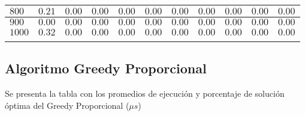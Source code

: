 \documentclass[12pt]{article}
\begin{document}
\begin{tabu}{|@{}*{11}{p{1.4cm}@{}|}}
$800$ & $0.21$ & $0.00$ & $0.00$ & $0.00$ & $0.00$ & $0.00$ & $0.00$ & $0.00$ & $0.00$ & $0.00$ \\\hline
$900$ & $0.00$ & $0.00$ & $0.00$ & $0.00$ & $0.00$ & $0.00$ & $0.00$ & $0.00$ & $0.00$ & $0.00$ \\\hline
$1000$ & $0.32$ & $0.00$ & $0.00$ & $0.00$ & $0.00$ & $0.00$ & $0.00$ & $0.00$ & $0.00$ & $0.00$ \\\hline
{}%
\end{tabu}
\pagebreak
\subsection*{Algoritmo Greedy Proporcional}
Se presenta la tabla con los promedios de ejecuci\'on y porcentaje de soluci\'on \'optima del Greedy Proporcional ($\mu s$)\\
\end{document}
